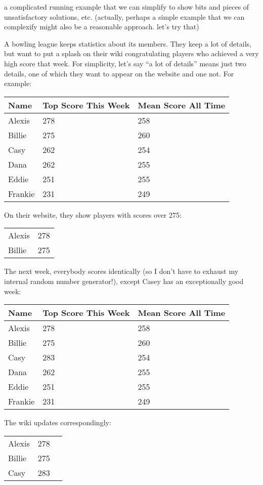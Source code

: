 \documentclass[12pt]{report}
\theoremstyle{definition}
\theoremstyle{remark}
\numberwithin{equation}{section}
\begin{document}
a complicated running example that we can simplify to show bits and pieces
of unsatisfactory solutions, etc. (actually, perhaps a simple example that
we can complexify might also be a reasonable approach. let's try that)

A bowling league keeps statistics about its members. They keep a lot of
details, but want to put a splash on their wiki congratulating players who
achieved a very high score that week.  For simplicity, let's say ``a lot of
details'' means just two details, one of which they want to appear on the
website and one not. For example:

\begin{tabular}{lll}
    Name & Top Score This Week & Mean Score All Time \\
    \hline
    Alexis  & 278 & 258 \\
    Billie  & 275 & 260 \\
    Casy    & 262 & 254 \\
    Dana    & 262 & 255 \\
    Eddie   & 251 & 255 \\
    Frankie & 231 & 249
\end{tabular}

On their website, they show players with scores over 275:

\begin{tabular}{ll}
    Alexis & 278 \\
    Billie & 275
\end{tabular}

The next week, everybody scores identically (so I don't have to exhaust my
internal random number generator!), except Casey has an exceptionally good
week:

\begin{tabular}{lll}
    Name & Top Score This Week & Mean Score All Time \\
    \hline
    Alexis  & 278 & 258 \\
    Billie  & 275 & 260 \\
    Casy    & 283 & 254 \\
    Dana    & 262 & 255 \\
    Eddie   & 251 & 255 \\
    Frankie & 231 & 249
\end{tabular}

The wiki updates correspondingly:

\begin{tabular}{lll}
    Alexis & 278 \\
    Billie & 275 \\
    Casy   & 283
\end{tabular}
\end{document}
